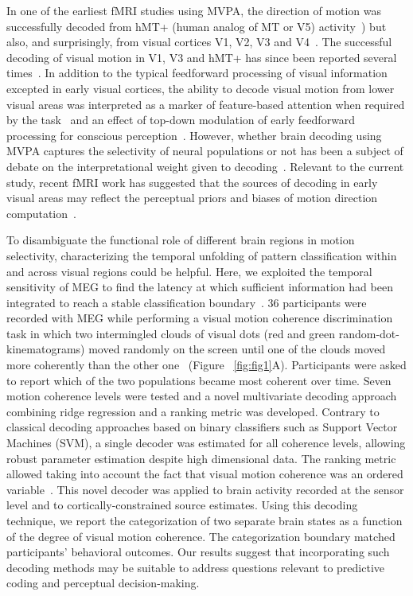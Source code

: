 In one of the earliest fMRI studies using MVPA, the direction of motion was successfully decoded from hMT+ (human analog of MT or V5) activity~\cite{12beauchamp1997graded}) but also, and surprisingly, from visual cortices V1, V2, V3 and V4~\cite{13kamitani2006decoding}. The successful decoding of visual motion in V1, V3 and hMT+ has since been reported several times~\cite{5kamitani2005decoding,13kamitani2006decoding,14serences2007representation,15hogendoorn2013decoding,16van2014decoding}. In addition to the typical feedforward processing of visual information excepted in early visual cortices, the ability to decode visual motion from lower visual areas was interpreted as a marker of  feature-based attention when required by the task~\cite{13kamitani2006decoding} and an effect of top-down modulation of early feedforward processing for conscious perception~\cite{14serences2007representation}. However, whether brain decoding using MVPA captures the selectivity of neural populations or not has been a subject of debate on the interpretational weight given to decoding~\cite{11haynes2015primer,17carlson2015sensible,mostert2015dissociating,pitts2012visual}. Relevant to the current study, recent fMRI work has suggested that the sources of decoding in early visual areas may reflect the perceptual priors and biases of motion direction computation~\cite{18vintch2014cortical}.

To disambiguate the functional role of different brain regions in motion selectivity, characterizing the temporal unfolding of pattern classification within and across visual regions could be helpful. Here, we exploited the temporal sensitivity of MEG to find the latency at which sufficient information had been integrated to reach a stable classification boundary~\cite{20mitchell2008predicting,21ramkumar2013feature,22king2014characterizing}. 36 participants were recorded with MEG while performing a visual motion coherence discrimination task in which two intermingled clouds of visual dots (red and green random-dot-kinematograms) moved randomly on the screen until one of the clouds moved more coherently than the other one~\cite{23zilber2014supramodal} (Figure ~\ref{fig:fig1}A). Participants were asked to report which of the two populations became most coherent over time. Seven motion coherence levels were tested and a novel multivariate decoding approach combining ridge regression and a ranking metric was developed. Contrary to classical decoding approaches based on binary classifiers such as Support Vector Machines (SVM), a single decoder was estimated for all coherence levels, allowing robust parameter estimation despite high dimensional data. The ranking metric allowed taking into account the fact that visual motion coherence was an ordered variable~\cite{herbrich00ordinal,Joachims:2002}. This novel decoder was applied to brain activity recorded at the sensor level and to cortically-constrained source estimates. Using this decoding technique, we report the categorization of two separate brain states as a function of the degree of visual motion coherence. The categorization boundary matched participants' behavioral outcomes. Our results suggest that incorporating such decoding methods may be suitable to address questions relevant to predictive coding and perceptual decision-making.

